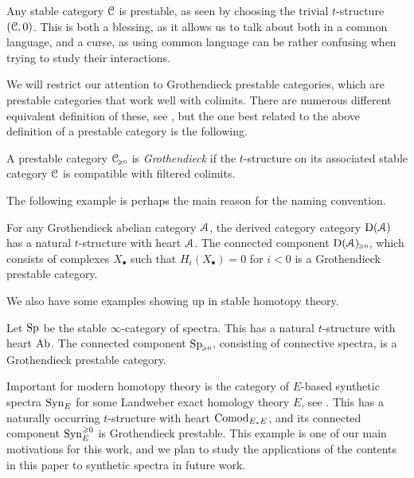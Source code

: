 \begin{remark}
    \label{ch3:rm:stable-is-prestable}
    Any stable category $\EuScript{C}$ is prestable, as seen by choosing the trivial $t$-structure $(\EuScript{C},0)$. This is both a blessing, as it allows us to talk about both in a common language, and a curse, as using common language can be rather confusing when trying to study their interactions.
\end{remark}

We will restrict our attention to Grothendieck prestable categories, which are prestable categories that work well with colimits. There are numerous different equivalent definition of these, see \cite[C.1.4.1]{lurie_SAG}, but the one best related to the above definition of a prestable category is the following. 

\begin{definition}
    A prestable category $\EuScript{C}_{\hspace{-1pt}\scriptscriptstyle\geqslant 0}$ is \emph{Grothendieck} if the $t$-structure on its associated stable category $\EuScript{C}$ is compatible with filtered colimits. 
\end{definition}

The following example is perhaps the main reason for the naming convention.

\begin{example}
    For any Grothendieck abelian category $\EuScript{A}$, the derived category category $\mathrm{D}(\EuScript{A})$ has a natural $t$-structure with heart $\EuScript{A}$. The connected component $\mathrm{D}(\EuScript{A})_{\hspace{-1pt}\scriptscriptstyle\geqslant 0}$, which consists of complexes $X_\bullet$ such that $H_i(X_\bullet) = 0$ for $i<0$ is a Grothendieck prestable category.  
\end{example}

We also have some examples showing up in stable homotopy theory. 

\begin{example}
    Let $\mathrm{Sp}$ be the stable $\infty$-category of spectra. This has a natural $t$-structure with heart $\mathrm{Ab}$. The connected component $\mathrm{Sp}_{\hspace{-1pt}\scriptscriptstyle\geqslant 0}$, consisting of connective spectra, is a Grothendieck prestable category. 
\end{example}

\begin{example}
    Important for modern homotopy theory is the category of $E$-based synthetic spectra $\mathrm{Syn}_{E}$ for some Landweber exact homology theory $E$, see \cite{pstragowski_2022}. This has a naturally occurring $t$-structure with heart $\mathrm{Comod}_{E_*E}$, and its connected component $\mathrm{Syn}_{E}^{\geqslant 0}$ is Grothendieck prestable. This example is one of our main motivations for this work, and we plan to study the applications of the contents in this paper to synthetic spectra in future work. 
\end{example}


